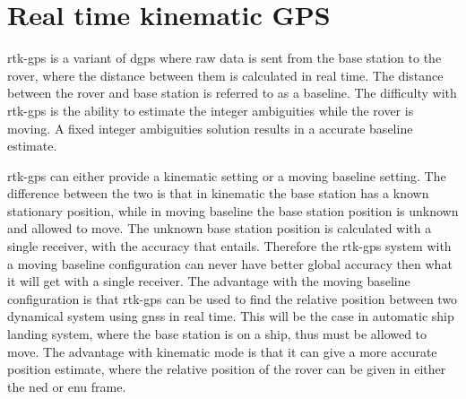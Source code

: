 \section{Real time kinematic GPS}\label{ss:rtk-gps}
\acrfull{rtk-gps} is a variant of \gls{dgps} where raw data is sent from the base station to the rover, where the distance between them is calculated in real time.
The distance between the rover and base station is referred to as a baseline. The difficulty with \gls{rtk-gps} is the ability to estimate the integer ambiguities while the rover is moving. A fixed integer ambiguities solution results in a accurate baseline estimate.

\gls{rtk-gps} can either provide a kinematic setting or a moving baseline setting. The difference between the two is that in kinematic the base station has a known stationary position, while in moving baseline the base station position is unknown and allowed to move. The unknown base station position is calculated with a single receiver, with the accuracy that entails. Therefore the \gls{rtk-gps} system with a moving baseline configuration can never have better global accuracy then what it will get with a single receiver. The advantage with the moving baseline configuration is that \gls{rtk-gps} can be used to find the relative position between two dynamical system using \gls{gnss} in real time. This will be the case in automatic ship landing system, where the base station is on a ship, thus must be allowed to move. The advantage with kinematic mode is that it can give a more accurate position estimate, where the relative position of the rover can be given in either the \gls{ned} or \gls{enu} frame.
\cleardoublepage